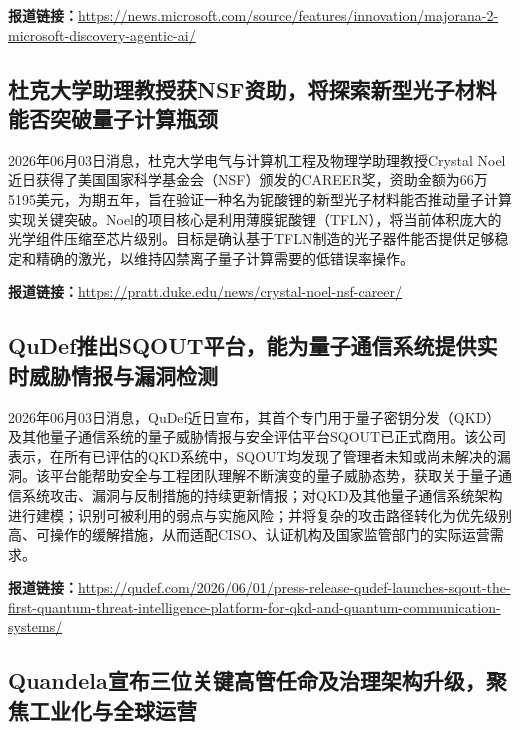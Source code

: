 \documentclass[12pt,a4paper]{ctexart}
\begin{document}
\noindent\textbf{报道链接：}\url{https://news.microsoft.com/source/features/innovation/majorana-2-microsoft-discovery-agentic-ai/}

\subsection{ 杜克大学助理教授获NSF资助，将探索新型光子材料能否突破量子计算瓶颈 }

2026年06月03日消息，杜克大学电气与计算机工程及物理学助理教授Crystal Noel近日获得了美国国家科学基金会（NSF）颁发的CAREER奖，资助金额为66万5195美元，为期五年，旨在验证一种名为铌酸锂的新型光子材料能否推动量子计算实现关键突破。Noel的项目核心是利用薄膜铌酸锂（TFLN），将当前体积庞大的光学组件压缩至芯片级别。目标是确认基于TFLN制造的光子器件能否提供足够稳定和精确的激光，以维持囚禁离子量子计算需要的低错误率操作。

\noindent\textbf{报道链接：}\url{https://pratt.duke.edu/news/crystal-noel-nsf-career/}

\subsection{ QuDef推出SQOUT平台，能为量子通信系统提供实时威胁情报与漏洞检测 }

2026年06月03日消息，QuDef近日宣布，其首个专门用于量子密钥分发（QKD）及其他量子通信系统的量子威胁情报与安全评估平台SQOUT已正式商用。该公司表示，在所有已评估的QKD系统中，SQOUT均发现了管理者未知或尚未解决的漏洞。该平台能帮助安全与工程团队理解不断演变的量子威胁态势，获取关于量子通信系统攻击、漏洞与反制措施的持续更新情报；对QKD及其他量子通信系统架构进行建模；识别可被利用的弱点与实施风险；并将复杂的攻击路径转化为优先级别高、可操作的缓解措施，从而适配CISO、认证机构及国家监管部门的实际运营需求。

\noindent\textbf{报道链接：}\url{https://qudef.com/2026/06/01/press-release-qudef-launches-sqout-the-first-quantum-threat-intelligence-platform-for-qkd-and-quantum-communication-systems/}

\subsection{ Quandela宣布三位关键高管任命及治理架构升级，聚焦工业化与全球运营 }
\end{document}
